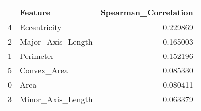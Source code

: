 \begin{tabular}{llr}
\toprule
 & Feature & Spearman_Correlation \\
\midrule
4 & Eccentricity & 0.229869 \\
2 & Major_Axis_Length & 0.165003 \\
1 & Perimeter & 0.152196 \\
5 & Convex_Area & 0.085330 \\
0 & Area & 0.080411 \\
3 & Minor_Axis_Length & 0.063379 \\
\bottomrule
\end{tabular}
